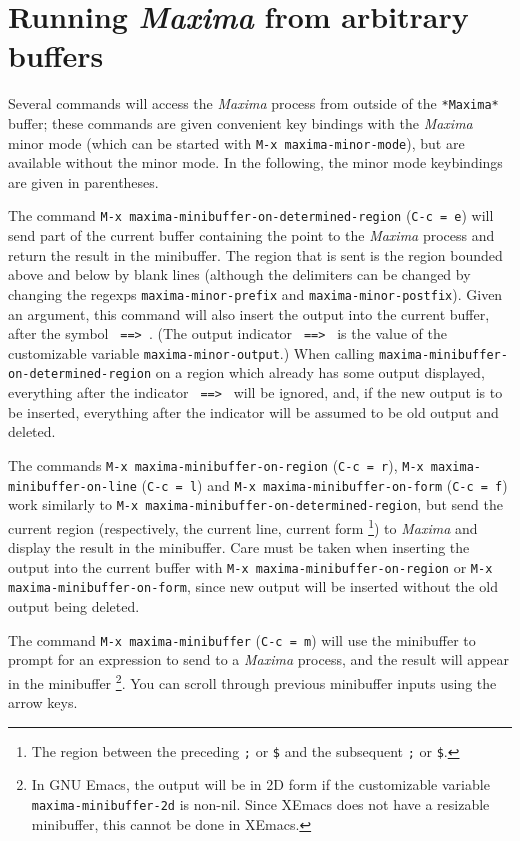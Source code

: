 \documentclass{article}
\newcommand{\mx}{\textsl{\sffamily Maxima}}
\newcommand{\hyph}{-\hspace{0pt}}
\begin{document}
\section{Running \mx{} from arbitrary buffers}

Several commands will access the \mx{} process from outside of the
\texttt{*Maxima*} buffer; these commands are given  convenient key
bindings  with the \mx{} minor mode (which can be started
with \texttt{M-x maxima-minor-mode}), but are available without the
minor mode.  In the following, the minor mode keybindings are given in
parentheses.

The command \texttt{M-x maxima-minibuffer-on-determined-region}
(\texttt{C-c = e}) will send part of the current buffer containing
the point to the \mx{} process and return the result in the
minibuffer.  The region that is sent is the region bounded above and
below by blank lines (although the delimiters can be changed by
changing the regexps \texttt{maxima\hyph{}minor\hyph{}prefix} and 
\texttt{maxima\hyph{}minor\hyph{}postfix}).  Given an argument, this command 
will also insert the output into the current buffer, after the symbol
\texttt{~==>~}.   (The output indicator \texttt{~==>~} is the value of
the customizable variable \texttt{maxima\hyph{}minor\hyph{}output}.)
When calling
\texttt{maxima\hyph{}minibuffer\hyph{}on\hyph{}determined\hyph{}region} on a region
which already has some output displayed, everything 
after the indicator \texttt{~==>~} will be ignored, and, if the new
output is to be inserted, everything after the indicator will be
assumed to be old output and deleted.

The commands \texttt{M-x maxima\hyph{}minibuffer\hyph{}on\hyph{}region} (\texttt{C-c = r}),
\texttt{M-x maxima\hyph{}minibuffer\hyph{}on\hyph{}line} (\texttt{C-c = l}) and 
\texttt{M-x maxima\hyph{}minibuffer\hyph{}on\hyph{}form} (\texttt{C-c = f}) work
similarly to \texttt{M-x maxima\hyph{}minibuffer\hyph{}on\hyph{}determined\hyph{}region}, but
send the current region (respectively, the current line, current form%
\footnote{The region between the preceding \texttt{;} or \texttt{\$}
  and the subsequent \texttt{;} or \texttt{\$}.})
to \mx{} and display the result in the minibuffer.
Care must be taken when inserting the output into the current buffer
with \texttt{M-x maxima\hyph{}minibuffer\hyph{}on\hyph{}region} or 
\texttt{M-x maxima\hyph{}minibuffer\hyph{}on\hyph{}form}, since new output will
be inserted without the old output being deleted.

The command \texttt{M-x maxima\hyph{}minibuffer} (\texttt{C-c = m}) will use
the minibuffer to prompt for an expression to send to a \mx{} process,
and the result will appear in the minibuffer%
\footnote{In GNU Emacs, the output will be in 2D form if the
customizable variable \texttt{maxima\hyph{}minibuffer\hyph{}2d} is non-nil.  Since
XEmacs does not have a resizable minibuffer, this cannot be done in
XEmacs.}.
You can scroll through previous minibuffer inputs using the arrow keys.
\end{document}
